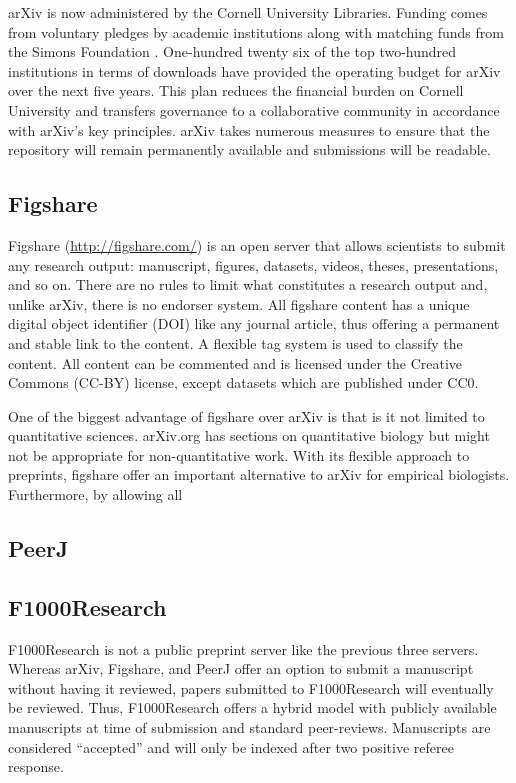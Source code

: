 \documentclass[letterpaper,twocolumn,superscriptaddress,showkeys]{revtex4}
\begin{document}
arXiv is now administered by the Cornell University Libraries.  Funding comes
from voluntary pledges by academic institutions along with matching funds from
the Simons Foundation \cite{arxiv_future}.  One-hundred twenty six of the top
two-hundred institutions in terms of downloads have provided the operating
budget for arXiv over the next five years.  This plan reduces the financial
burden on Cornell University and transfers governance to a collaborative
community in accordance with arXiv's key principles.  arXiv takes numerous
measures to ensure that the repository will remain permanently available and
submissions will be readable.

\subsection{Figshare}

Figshare (\href{http://figshare.com/}{http://figshare.com/}) is an open server
that allows scientists to submit any research output: manuscript, figures,
datasets, videos, theses, presentations, and so on. There are no rules to limit
what constitutes a research output and, unlike arXiv, there is no endorser
system. All figshare content has a unique digital object identifier (DOI) like
any journal article, thus offering a permanent and stable link to the content.
A flexible tag system is used to classify the content. All content can
be commented and is licensed under the Creative Commons (CC-BY) license, except
datasets which are published under CC0.

One of the biggest advantage of figshare over arXiv is that is it not limited to
quantitative sciences. arXiv.org has sections on quantitative biology but might
not be appropriate for non-quantitative work. With its flexible approach to
preprints, figshare offer an important alternative to arXiv for empirical
biologists. Furthermore, by allowing all 

\subsection{PeerJ}


\subsection{F1000Research}

F1000Research is not a public preprint server like the previous three servers.
Whereas arXiv, Figshare, and PeerJ offer an option to submit a manuscript
without having it reviewed, papers submitted to F1000Research will eventually be
reviewed. Thus, F1000Research offers a hybrid model with publicly available
manuscripts at time of submission and standard peer-reviews. Manuscripts are
considered ``accepted'' and will only be indexed after two positive referee
response.
\end{document}
